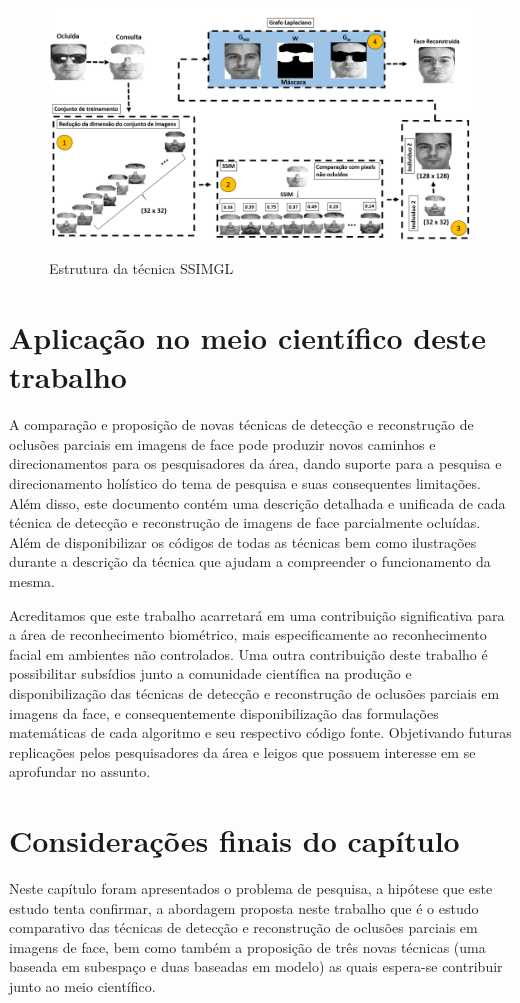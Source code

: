 \begin{figure}[H]
\centering
\caption{Estrutura da técnica SSIMGL}
\includegraphics[scale = 0.40]{imgs4/estrutura/estrutura_ssimgl}
\label{fig:estrutura_ssimgl}
\end{figure}


\section{Aplicação no meio científico deste trabalho}

A comparação e proposição de novas técnicas de detecção e reconstrução de oclusões parciais em imagens de face pode produzir novos caminhos e direcionamentos para os pesquisadores da área, dando suporte para a pesquisa e direcionamento holístico do tema de pesquisa e suas consequentes limitações. Além disso, este documento contém uma descrição detalhada e unificada de cada técnica de detecção e reconstrução de imagens de face parcialmente ocluídas. Além de disponibilizar os códigos  de todas as técnicas bem como ilustrações durante a descrição da técnica que ajudam a compreender o funcionamento da mesma.


Acreditamos que este trabalho acarretará em uma contribuição significativa para a área de reconhecimento biométrico, mais especificamente ao reconhecimento facial em ambientes não controlados. Uma outra contribuição deste trabalho é possibilitar subsídios junto a comunidade científica na produção e disponibilização das técnicas de detecção e reconstrução de oclusões parciais em imagens da face, e consequentemente disponibilização das formulações matemáticas de cada algoritmo e seu respectivo código fonte. Objetivando futuras replicações pelos pesquisadores da área e leigos que possuem interesse em se aprofundar no assunto.


\section{Considerações finais do capítulo}

Neste capítulo foram apresentados o problema de pesquisa, a hipótese que este estudo tenta confirmar, a abordagem proposta neste trabalho que é o estudo comparativo das técnicas de detecção e reconstrução de oclusões parciais em imagens de face, bem como também a proposição de três novas técnicas (uma baseada em subespaço e duas baseadas em modelo) as quais espera-se contribuir junto ao meio científico.